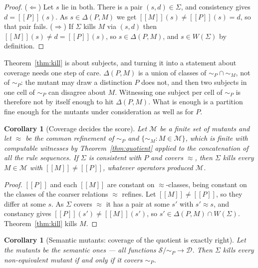 \documentclass[11pt,a4paper]{article}
\theoremstyle{plain}
\newtheorem{corollary}[theorem]{Corollary}
\theoremstyle{definition}
\theoremstyle{remark}
\newcommand{\sem}[1]{[\![#1]\!]}
\newcommand{\Dom}{\mathcal{D}}
\newcommand{\Sub}{\mathcal{S}}
\begin{document}
\begin{proof}
($\Leftarrow$) Let $s$ lie in both. There is a pair $(s,d) \in \Sigma$, and consistency
gives $d = \sem{P}(s)$. As $s \in \Delta(P,M)$ we get $\sem{M}(s) \neq \sem{P}(s) = d$, so
that pair fails. ($\Rightarrow$) If $\Sigma$ kills $M$ via $(s,d)$ then
$\sem{M}(s) \neq d = \sem{P}(s)$, so $s \in \Delta(P,M)$, and $s \in W(\Sigma)$ by
definition.
\end{proof}

Theorem~\ref{thm:kill} is about subjects, and turning it into a statement about coverage
needs one step of care. $\Delta(P,M)$ is a union of classes of $\sim_P \cap \sim_M$, not of
$\sim_P$: the mutant may draw a distinction $P$ does not, and then two subjects in one cell
of $\sim_P$ can disagree about $M$. Witnessing one subject per cell of $\sim_P$ is therefore
not by itself enough to hit $\Delta(P,M)$. What is enough is a partition fine enough for the
mutants under consideration as well as for $P$.

\begin{corollary}[Coverage decides the score]
\label{cor:score}
Let $\mathcal{M}$ be a finite set of mutants and let $\approx$ be the common refinement of
$\sim_P$ and $\{\sim_M : M \in \mathcal{M}\}$, which is finite with computable witnesses by
Theorem~\ref{thm:quotient} applied to the concatenation of all the rule sequences. If
$\Sigma$ is consistent with $P$ and covers $\approx$, then $\Sigma$ kills every
$M \in \mathcal{M}$ with $\sem{M} \neq \sem{P}$, whatever operators produced $\mathcal{M}$.
\end{corollary}

\begin{proof}
$\sem{P}$ and each $\sem{M}$ are constant on $\approx$-classes, being constant on the
classes of the coarser relations $\approx$ refines. Let $\sem{M} \neq \sem{P}$, so they
differ at some $s$. As $\Sigma$ covers $\approx$ it has a pair at some $s'$ with
$s' \approx s$, and constancy gives $\sem{P}(s') \neq \sem{M}(s')$, so
$s' \in \Delta(P,M) \cap W(\Sigma)$. Theorem~\ref{thm:kill} kills $M$.
\end{proof}

\begin{corollary}[Semantic mutants: coverage of the quotient is exactly right]
\label{cor:semantic}
Let the mutants be the \emph{semantic} ones --- all functions $\Sub/{\sim_P} \to \Dom$.
Then $\Sigma$ kills every non-equivalent mutant if and only if it covers $\sim_P$.
\end{corollary}
\end{document}
